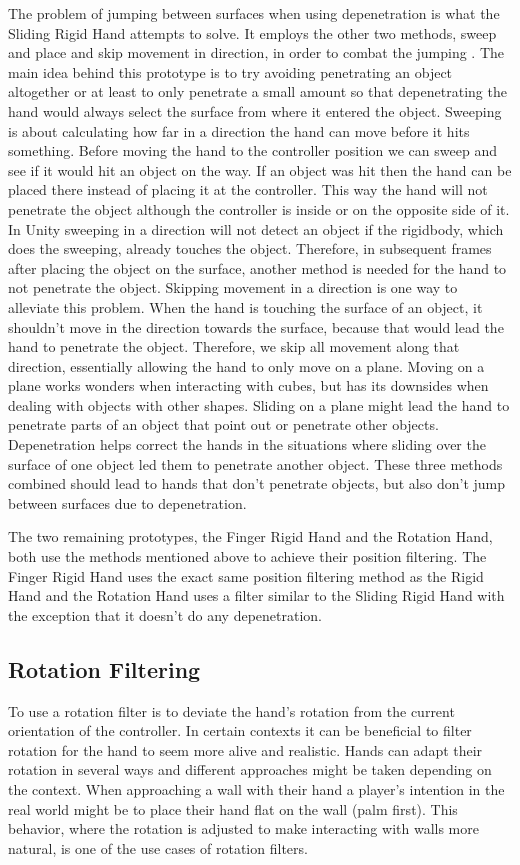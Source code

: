 The problem of jumping between surfaces when using depenetration is what the Sliding Rigid Hand attempts to solve. It employs the other two methods, sweep and place and skip movement in direction, in order to combat the jumping . The main idea behind this prototype is to try avoiding penetrating an object altogether or at least to only penetrate a small amount so that depenetrating the hand would always select the surface from where it entered the object. Sweeping is about calculating how far in a direction the hand can move before it hits something. Before moving the hand to the controller position we can sweep and see if it would hit an object on the way. If an object was hit then the hand can be placed there instead of placing it at the controller. This way the hand will not penetrate the object although the controller is inside or on the opposite side of it. In Unity sweeping in a direction will not detect an object if the rigidbody, which does the sweeping, already touches the object. Therefore, in subsequent frames after placing the object on the surface, another method is needed for the hand to not penetrate the object. Skipping movement in a direction is one way to alleviate this problem. When the hand is touching the surface of an object, it shouldn't move in the direction towards the surface, because that would lead the hand to penetrate the object. Therefore, we skip all movement along that direction, essentially allowing the hand to only move on a plane. Moving on a plane works wonders when interacting with cubes, but has its downsides when dealing with objects with other shapes. Sliding on a plane might lead the hand to penetrate parts of an object that point out or penetrate other objects. Depenetration helps correct the hands in the situations where sliding over the surface of one object led them to penetrate another object. These three methods combined should lead to hands that don't penetrate objects, but also don't jump between surfaces due to depenetration.

The two remaining prototypes, the Finger Rigid Hand and the Rotation Hand, both use the methods mentioned above to achieve their position filtering. The Finger Rigid Hand uses the exact same position filtering method as the Rigid Hand and the Rotation Hand uses a filter similar to the Sliding Rigid Hand with the exception that it doesn't do any depenetration.

\subsection{Rotation Filtering}
\label{subsec:categoryRotationFiltering}
To use a rotation filter is to deviate the hand's rotation from the current orientation of the controller. In certain contexts it can be beneficial to filter rotation for the hand to seem more alive and realistic. Hands can adapt their rotation in several ways and different approaches might be taken depending on the context. When approaching a wall with their hand a player's intention in the real world might be to place their hand flat on the wall (palm first). This behavior, where the rotation is adjusted to make interacting with walls more natural, is one of the use cases of rotation filters.

